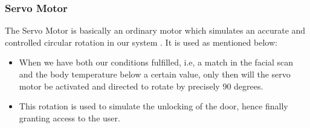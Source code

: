\documentclass[conference]{IEEEtran}
\begin{document}
	\subsubsection{Servo Motor}
	The Servo Motor is basically an ordinary motor which simulates an accurate and controlled circular rotation in our system \cite{j}. It is used as mentioned below:
	\begin{itemize}
		\item When we have both our conditions fulfilled, i.e, a match in the facial scan and the body temperature below a certain value, only then will the servo motor be activated and directed to rotate by precisely 90 degrees.
		\item This rotation is used to simulate the unlocking of the door, hence finally granting access to the user.\\\\
	\end{itemize}
	
	
\end{document}
